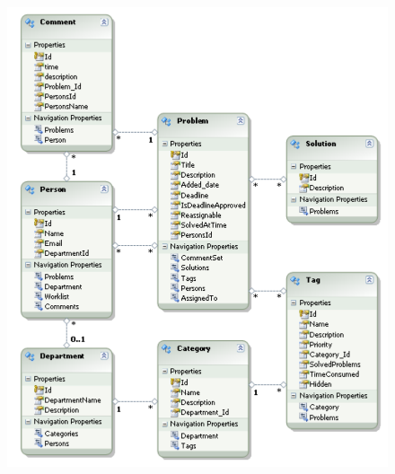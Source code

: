 \begin{figure}[H]
	\centering
		\includegraphics[scale=0.7]{input/implementation/mvc/Model.pdf}
	\label{fig:edmxModel}
\end{figure}
